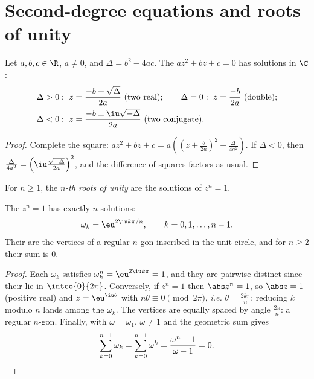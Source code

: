 \section{Second-degree equations and roots of unity}

\begin{theorem}\label{thm:g12:complex:quadratic}
Let $a, b, c \in \R$, $a \neq 0$, and $\Delta = b^2 - 4ac$. The 
$az^2 + bz + c = 0$ has solutions in $\C$:
\[
\begin{aligned}
&\Delta > 0:\ z = \frac{-b \pm \sqrt{\Delta}}{2a} \ (\text{two real}); \qquad
\Delta = 0:\ z = \frac{-b}{2a} \ (\text{double}); \\
&\Delta < 0:\ z = \frac{-b \pm \iu\sqrt{-\Delta}}{2a} \ (\text{two conjugate}).
\end{aligned}
\]
\end{theorem}

\begin{proof}
Complete the square:
$az^2 + bz + c = a\left(\left(z + \frac{b}{2a}\right)^2 -
\frac{\Delta}{4a^2}\right)$. If $\Delta < 0$, then
$\frac{\Delta}{4a^2} = \left(\iu\frac{\sqrt{-\Delta}}{2a}\right)^2$, and the
difference of squares factors as usual.
\end{proof}

\begin{definition}\label{def:g12:complex:rootsofunity}
For $n \geq 1$, the \emph{$n$-th roots of unity} are
the solutions of $z^n = 1$.
\end{definition}

\begin{theorem}\label{thm:g12:complex:rootsofunity}
The  $z^n = 1$ has exactly $n$ solutions:
\[
\omega_k = \eu^{2\iu k\pi/n}, \qquad k = 0, 1, \dots, n-1 .
\]
Their  are the vertices of a regular $n$-gon inscribed in the unit
circle, and for $n \geq 2$ their sum is $0$.
\end{theorem}

\begin{proof}
Each $\omega_k$ satisfies $\omega_k^n = \eu^{2\iu k\pi} = 1$, and they are
pairwise distinct since their  lie in $\intco{0}{2\pi}$.
Conversely, if $z^n = 1$ then $\abs z^n = 1$, so $\abs z = 1$ (positive
real) and $z = \eu^{\iu\theta}$ with $n\theta \equiv 0 \pmod{2\pi}$,
\emph{i.e.} $\theta = \frac{2k\pi}{n}$; reducing $k$ modulo $n$ lands among
the $\omega_k$. The vertices are equally spaced by angle $\frac{2\pi}{n}$:
a regular $n$-gon. Finally, with $\omega = \omega_1$,
$\omega \neq 1$ and the geometric sum gives
\[
\sum_{k=0}^{n-1}\omega_k = \sum_{k=0}^{n-1}\omega^k
= \frac{\omega^n - 1}{\omega - 1} = 0 . \qedhere
\]
\end{proof}

